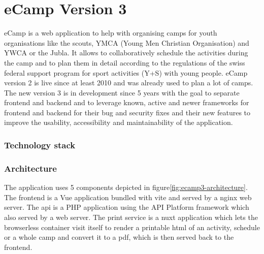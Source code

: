 \documentclass[conference]{IEEEtran}
\begin{document}
\section{eCamp Version 3}

eCamp is a web application to help with organising camps for youth organisations like the
scouts, YMCA (Young Men Christian Organisation)\cite{ymca-website} and YWCA or the Jubla.
It allows to collaboratively schedule the activities during the camp and to plan them in detail
according to the regulations of the swiss federal support program for sport activities (Y+S) with young people\cite{J+S-Website,ecamp3-website}.
eCamp version 2 is live since at least 2010\cite{ecamp2-first-commit} and was already used to plan a lot of camps.
The new version 3 is in development since 5 years\cite{ecamp3-website} with the goal to separate frontend and backend and
to leverage known, active and newer frameworks for frontend and backend for their bug and security fixes and
their new features to improve the usability, accessibility and maintainability of the application.

\subsubsection{Technology stack}

\subsubsection{Architecture}

The application uses 5 components depicted in figure\ref{fig:ecamp3-architecture}.
The frontend is a Vue application bundled with vite and served by a nginx web server.
The api is a PHP application using the API Platform framework which also served by a web server.
The print service is a nuxt application which lets the browserless container visit itself to render a printable
html of an activity, schedule or a whole camp and convert it to a pdf, which is then served back to the frontend.
\end{document}
